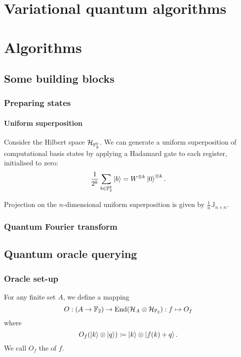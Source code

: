 \chapter{Variational quantum algorithms}

\chapter{Algorithms}
\section{Some building blocks}
\subsection{Preparing states}
\subsubsection{Uniform superposition}
\begin{lemma}
Consider the Hilbert space $\mathcal{H}_{\mathbb{F}_2^k}$. We can generate a uniform superposition of computational basis states by applying a Hadamard gate to each register, initialised to zero:
\[ \frac{1}{2^k}\sum_{b\in \mathbb{F}_2^k}\left| b \right\rangle = W^{\otimes k}\left| 0 \right\rangle^{\otimes k}. \]
\end{lemma}

Projection on the $n$-dimensional uniform superposition is given by $\frac{1}{n}\mathbb{J}_{n\times n}$.
\subsection{Quantum Fourier transform}

\section{Quantum oracle querying}
\subsection{Oracle set-up}
\begin{definition}
For any finite set $A$, we define a mapping
\[ O: (A\to \mathbb{F}_2) \to \operatorname{End}(\mathcal{H}_{A}\otimes \mathcal{H}_{\mathbb{F}_2}): f\mapsto O_f \]
where
\[ O_f(\left| k \right\rangle\otimes \left| q \right\rangle) \coloneqq \left| k \right\rangle\otimes \left| f(k) + q \right\rangle.  \]
We call $O_f$ the  of $f$.
\end{definition}

